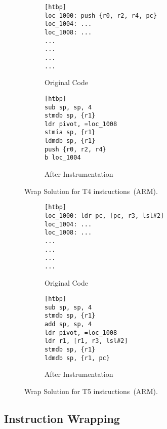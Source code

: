 \begin{figure*}[htbp]
\centering
\begin{subfigure}[b]{0.48\textwidth}
\begin{lstlisting}[language=ARMASM,label=lst:s4_1, firstnumber=1][htbp]
loc_1000: push {r0, r2, r4, pc}
loc_1004: ...
loc_1008: ...
...
...
...
...
\end{lstlisting}
\caption{Original Code}
\end{subfigure}%
\begin{subfigure}[b]{0.48\textwidth}
\begin{lstlisting}[language=ARMASM,label=lst:s4_2, firstnumber=1][htbp]
sub sp, sp, 4
stmdb sp, {r1}
ldr pivot, =loc_1008
stmia sp, {r1}
ldmdb sp, {r1}
push {r0, r2, r4}
b loc_1004
\end{lstlisting}
\caption{After Instrumentation}
\end{subfigure}%

\caption{Wrap Solution for T4 instructions~(ARM).}
\label{figs:t4}
\end{figure*}




\begin{figure*}[htbp]
\centering
\begin{subfigure}[b]{0.48\textwidth}
\begin{lstlisting}[language=ARMASM,label=lst:s5_1, firstnumber=1][htbp]
loc_1000: ldr pc, [pc, r3, lsl#2]
loc_1004: ...
loc_1008: ...
...
...
...
...
\end{lstlisting}
\caption{Original Code}
\end{subfigure}%
\begin{subfigure}[b]{0.48\textwidth}
\begin{lstlisting}[language=ARMASM,label=lst:s5_2, firstnumber=1][htbp]
sub sp, sp, 4
stmdb sp, {r1}
add sp, sp, 4
ldr pivot, =loc_1008
ldr r1, [r1, r3, lsl#2]
stmdb sp, {r1}
ldmdb sp, {r1, pc}
\end{lstlisting}
\caption{After Instrumentation}
\end{subfigure}%

\caption{Wrap Solution for T5 instructions~(ARM).}
\label{figs:t5}
\end{figure*}

\subsection{Instruction Wrapping}\label{sec:impl:wrap}


